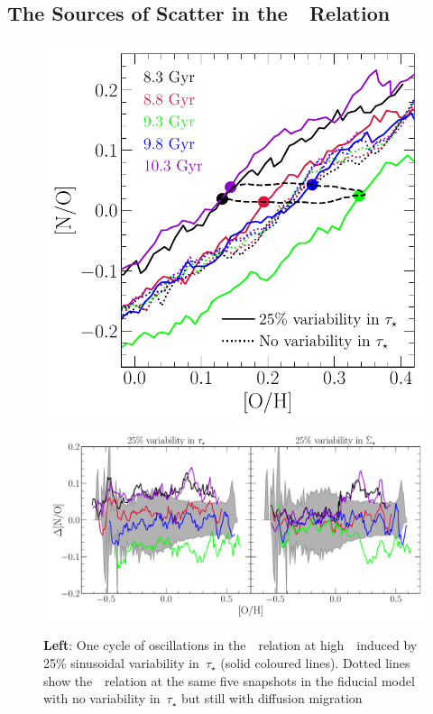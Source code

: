 \documentclass[ms.tex]{subfiles}
\begin{document}
\subsection{The Sources of Scatter in the~\ohno~Relation}
\label{sec:results:schaefer_comp}

\begin{figure}
\centering
\includegraphics[scale = 0.44]{no_oh_sfevar.pdf}
\includegraphics[scale = 0.47]{delta_no_schaefercomp.pdf}
\caption{
\textbf{Left}: One cycle of oscillations in the~\ohno~relation at
high~\oh~induced by 25\% sinusoidal variability in~$\tau_\star$ (solid coloured
lines).
Dotted lines show the~\ohno~relation at the same five snapshots in the fiducial
model with no variability in~$\tau_\star$ but still with diffusion migration
}
\end{figure}
\end{document}
